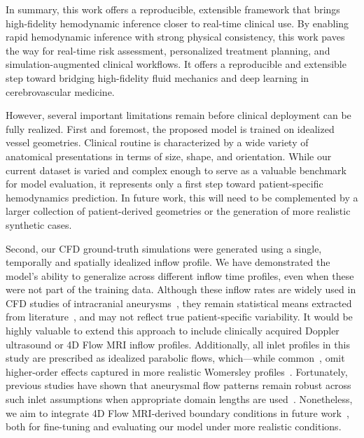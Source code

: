 In summary, this work offers a reproducible, extensible framework that brings high-fidelity hemodynamic inference closer to real-time clinical use. By enabling rapid hemodynamic inference with strong physical consistency, this work paves the way for real-time risk assessment, personalized treatment planning, and simulation-augmented clinical workflows. It offers a reproducible and extensible step toward bridging high-fidelity fluid mechanics and deep learning in cerebrovascular medicine.

However, several important limitations remain before clinical deployment can be fully realized. First and foremost, the proposed model is trained on idealized vessel geometries. Clinical routine is characterized by a wide variety of anatomical presentations in terms of size, shape, and orientation. While our current dataset is varied and complex enough to serve as a valuable benchmark for model evaluation, it represents only a first step toward patient-specific hemodynamics prediction. In future work, this will need to be complemented by a larger collection of patient-derived geometries or the generation of more realistic synthetic cases.

Second, our CFD ground-truth simulations were generated using a single, temporally and spatially idealized inflow profile. We have demonstrated the model’s ability to generalize across different inflow time profiles, even when these were not part of the training data. Although these inflow rates are widely used in CFD studies of intracranial aneurysms~\cite{cebral_characterization_2005, larrabide_change_2016, lu_hemodynamics_2025}, they remain statistical means extracted from literature~\cite{reymond_validation_2009, hoi_characterization_2011}, and may not reflect true patient-specific variability. It would be highly valuable to extend this approach to include clinically acquired Doppler ultrasound or 4D Flow MRI inflow profiles. Additionally, all inlet profiles in this study are prescribed as idealized parabolic flows, which—while common~\cite{qian_risk_2011, larrabide_change_2016, lu_hemodynamics_2025}, omit higher-order effects captured in more realistic Womersley profiles~\cite{cebral_characterization_2005}. Fortunately, previous studies have shown that aneurysmal flow patterns remain robust across such inlet assumptions when appropriate domain lengths are used~\cite{saalfeld_flow-splitting-based_2019}. Nonetheless, we aim to integrate 4D Flow MRI-derived boundary conditions in future work~\cite{brindise_multi-modality_2019}, both for fine-tuning and evaluating our model under more realistic conditions.

